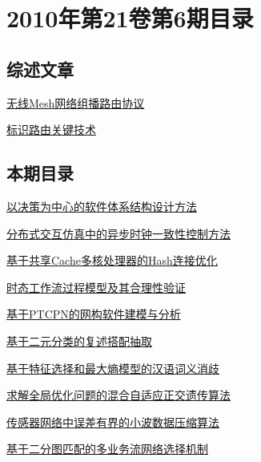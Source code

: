 \documentclass[a4paper]{article}
\begin{document}
\section{\textbf{2010年第21卷第6期目录}}
\subsection{综述文章}
\href{http://www.jos.org.cn/ch/reader/download_pdf.aspx?file_no=3777&year_id=2010&quarter_id=6&falg=1}{无线Mesh网络组播路由协议}

\href{http://www.jos.org.cn/ch/reader/download_pdf.aspx?file_no=3797&year_id=2010&quarter_id=6&falg=1}{标识路由关键技术}

\subsection{本期目录}
\href{http://www.jos.org.cn/ch/reader/download_pdf.aspx?file_no=3588&year_id=2010&quarter_id=6&falg=1}{以决策为中心的软件体系结构设计方法}

\href{http://www.jos.org.cn/ch/reader/download_pdf.aspx?file_no=3630&year_id=2010&quarter_id=6&falg=1}{分布式交互仿真中的异步时钟一致性控制方法}

\href{http://www.jos.org.cn/ch/reader/download_pdf.aspx?file_no=3575&year_id=2010&quarter_id=6&falg=1}{基于共享Cache多核处理器的Hash连接优化}

\href{http://www.jos.org.cn/ch/reader/download_pdf.aspx?file_no=3608&year_id=2010&quarter_id=6&falg=1}{时态工作流过程模型及其合理性验证}

\href{http://www.jos.org.cn/ch/reader/download_pdf.aspx?file_no=3578&year_id=2010&quarter_id=6&falg=1}{基于PTCPN的网构软件建模与分析}

\href{http://www.jos.org.cn/ch/reader/download_pdf.aspx?file_no=3586&year_id=2010&quarter_id=6&falg=1}{基于二元分类的复述搭配抽取}

\href{http://www.jos.org.cn/ch/reader/download_pdf.aspx?file_no=3591&year_id=2010&quarter_id=6&falg=1}{基于特征选择和最大熵模型的汉语词义消歧}

\href{http://www.jos.org.cn/ch/reader/download_pdf.aspx?file_no=3592&year_id=2010&quarter_id=6&falg=1}{求解全局优化问题的混合自适应正交遗传算法}

\href{http://www.jos.org.cn/ch/reader/download_pdf.aspx?file_no=3518&year_id=2010&quarter_id=6&falg=1}{传感器网络中误差有界的小波数据压缩算法}

\href{http://www.jos.org.cn/ch/reader/download_pdf.aspx?file_no=3519&year_id=2010&quarter_id=6&falg=1}{基于二分图匹配的多业务流网络选择机制}
\end{document}
